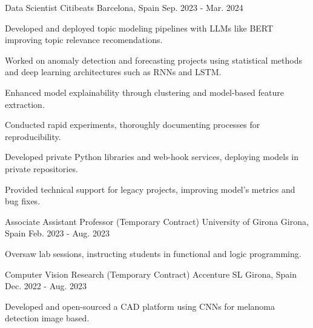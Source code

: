 

\begin{cventries}


  \cventry
  {Data Scientist} %
  {Citibeats} %
  {Barcelona, Spain} %
  {Sep. 2023 - Mar. 2024} %
  {
  \begin{cvitems}
\item {Developed and deployed topic modeling pipelines with LLMs like BERT improving topic relevance recomendations.}
\item {Worked on anomaly detection and forecasting projects using statistical methods and deep learning architectures
  such as RNNs and LSTM.}
\item {Enhanced model explainability through clustering and model-based feature extraction.}
\item {Conducted rapid experiments, thoroughly documenting processes for reproducibility.}
\item {Developed private Python libraries and web-hook services, deploying models in private repositories.}
\item {Provided technical support for legacy projects, improving model's metrics and bug fixes.}
  \end{cvitems}
}


  \cventry
  {Associate Assistant Professor (Temporary Contract)} %
  {University of Girona} %
  {Girona, Spain} %
  {Feb. 2023 - Aug. 2023} %
  {
    \begin{cvitems} %
    \item {Oversaw lab sessions, instructing students in functional and logic programming.}
    \end{cvitems}
    }


    \cventry
    {Computer Vision Research (Temporary Contract)} %
    {Accenture SL} %
    {Girona, Spain} %
    {Dec. 2022 - Aug. 2023} %
    {
    \begin{cvitems}
    \item {Developed and open-sourced a CAD platform using CNNs for melanoma detection image based.}
    \end{cvitems}
    }


\end{cventries}
